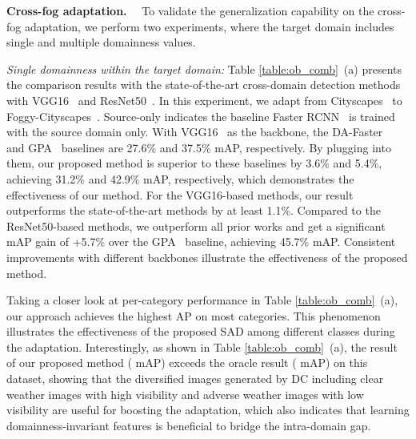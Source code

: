 \documentclass[10pt,journal,compsoc]{IEEEtran}
\renewcommand{\paragraph}[1]{\noindent\textbf{#1}~~}
\begin{document}
\paragraph{Cross-fog adaptation.}
To validate the generalization capability on the cross-fog adaptation, we perform two experiments, where the target domain includes single and multiple domainness values.

\noindent  
\emph{Single domainness within the target domain:}
Table \ref{table:ob_comb}~(a) presents the comparison results with the state-of-the-art cross-domain detection methods with VGG16~\cite{vgg} and ResNet50~\cite{he2016deep}. In this experiment, we adapt from Cityscapes~\cite{cordts2016cityscapes} to Foggy-Cityscapes~\cite{FoggyCity}. Source-only indicates the baseline Faster RCNN~\cite{ren2015faster} is trained with the source domain only.  With VGG16~\cite{vgg} as the backbone, the DA-Faster~\cite{DA-Faster-RCNN} and GPA~\cite{GPA} baselines are 27.6\% and 37.5\% mAP, respectively. By plugging into them, our proposed method is superior to these baselines by 3.6\% and 5.4\%, achieving 31.2\% and 42.9\% mAP, respectively, which demonstrates the effectiveness of our method. 
For the VGG16-based methods, our result outperforms the state-of-the-art methods
by at least 1.1\%. Compared to the ResNet50-based methods, we outperform all prior works and get a significant mAP gain of +5.7\% over the GPA~\cite{GPA} baseline, achieving 45.7\% mAP.  Consistent improvements with different backbones illustrate
the effectiveness of the proposed method. 



Taking a closer look at per-category  performance in Table \ref{table:ob_comb}~(a), our approach achieves the highest AP on most categories.
This phenomenon illustrates the effectiveness of the proposed SAD among different classes during the adaptation. Interestingly, as shown in Table \ref{table:ob_comb}~(a), the result of our proposed method ( mAP) exceeds the oracle result ( mAP) on this dataset, showing that the diversified images generated by DC including clear weather images with high visibility and adverse weather images with low visibility are useful for boosting the adaptation, which also indicates that learning domainness-invariant features is beneficial to bridge the intra-domain gap.
\end{document}
